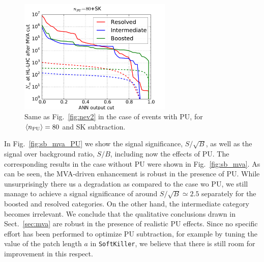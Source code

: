 \begin{figure}[t]
\begin{center}
\includegraphics[width=0.65\textwidth]{plots/nev2_SKPU80.pdf}
\caption{\small Same as Fig.~\ref{fig:nev2} in the
case of events with PU, for
 $\left\langle n_{\rm PU}\right\rangle=80$ 
  and SK subtraction.
}
\label{fig:nev2_PU}
\end{center}
\end{figure}


In Fig.~\ref{fig:sb_mva_PU} we show the signal significance,
$S/\sqrt{B}$, as well as the signal over background ratio,
$S/B$, including now the effects of PU.
%
The corresponding results in the case without PU were shown in
Fig.~\ref{fig:sb_mva}.
%
As can be seen, the MVA-driven enhancement is robust in the
presence of PU.
%
While unsurprisingly there us a degradation as compared to the case wo PU,
we still manage to achieve a signal significance of
around $S/\sqrt{B}\simeq 2.5$ separately for the boosted and resolved
categories.
%
On the other hand, the intermediate category becomes irrelevant.
%
We conclude that the qualitative conclusions drawn in
Sect.~\ref{sec:mva} are robust in the presence
of realistic PU effects.
%
Since no specific effort has been performed to
optimize PU subtraction, for example by tuning the value
of the patch length $a$ in {\tt SoftKiller}, we believe that
there is
still room for improvement in this respect.


